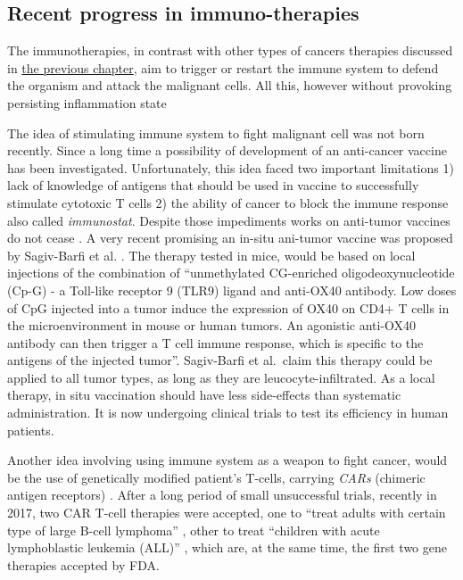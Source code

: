 \documentclass[12pt,]{book}
\theoremstyle{definition}
\theoremstyle{definition}
\theoremstyle{definition}
\theoremstyle{remark}
\begin{document}
\hypertarget{recent-progress-in-immuno-therapies}{%
\subsection{Recent progress in
immuno-therapies}\label{recent-progress-in-immuno-therapies}}

The immunotherapies, in contrast with other types of cancers therapies
discussed in \protect\hyperlink{cancer_Therapies}{the previous chapter},
aim to trigger or restart the immune system to defend the organism and
attack the malignant cells. All this, however without provoking
persisting inflammation state \citep{Predina2013}

The idea of stimulating immune system to fight malignant cell was not
born recently. Since a long time a possibility of development of an
anti-cancer vaccine has been investigated. Unfortunately, this idea
faced two important limitations 1) lack of knowledge of antigens that
should be used in vaccine to successfully stimulate cytotoxic T cells 2)
the ability of cancer to block the immune response also called
\emph{immunostat}. Despite those impediments works on anti-tumor
vaccines do not cease \citep{Palucka2013}. A very recent promising an
in-situ ani-tumor vaccine was proposed by Sagiv-Barfi et al.
\citep{Sagiv-Barfi2018}. The therapy tested in mice, would be based on
local injections of the combination of ``unmethylated CG-enriched
oligodeoxynucleotide (Cp-G) - a Toll-like receptor 9 (TLR9) ligand and
anti-OX40 antibody. Low doses of CpG injected into a tumor induce the
expression of OX40 on CD4+ T cells in the microenvironment in mouse or
human tumors. An agonistic anti-OX40 antibody can then trigger a T cell
immune response, which is specific to the antigens of the injected
tumor''. Sagiv-Barfi et al.~claim this therapy could be applied to all
tumor types, as long as they are leucocyte-infiltrated. As a local
therapy, in situ vaccination should have less side-effects than
systematic administration. It is now undergoing clinical trials to test
its efficiency in human patients.

Another idea involving using immune system as a weapon to fight cancer,
would be the use of genetically modified patient's T-cells, carrying
\emph{CARs} (chimeric antigen receptors) \citep{Jackson2016}. After a
long period of small unsuccessful trials, recently in 2017, two CAR
T-cell therapies were accepted, one to ``treat adults with certain type
of large B-cell lymphoma'' \citep{FDACARTadult}, other to treat
``children with acute lymphoblastic leukemia (ALL)'' \citep{FDACARTALL}
, which are, at the same time, the first two gene therapies accepted by
FDA.
\end{document}
